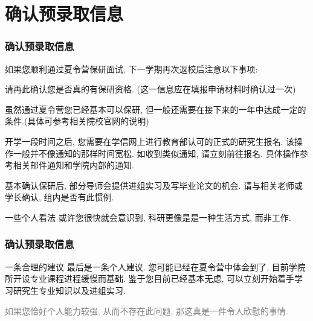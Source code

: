 \documentclass[usenames,dvipsnames]{beamer}
\begin{document}
    \section{确认预录取信息}  
    
    \begin{frame}
      \frametitle{确认预录取信息}
      如果您顺利通过夏令营保研面试, 下一学期再次返校后注意以下事项:
      \begin{description}[leftmargin=!,labelwidth=\widthof{\bfseries 录取信息确认}]
        \small
        \item[保研资格] 请再此确认您是否真的有保研资格. (这一信息应在填报申请材料时确认过一次)
        \item[保研条件] 虽然通过夏令营您已经基本可以保研, 但一般还需要在接下来的一年中达成一定的条件.(具体可参考相关院校官网的说明)
        \item[正式申请] 开学一段时间之后, 您需要在学信网上进行教育部认可的正式的研究生报名. 该操作一般并不像通知的那样时间宽松. 如收到类似通知, 请立刻前往报名. 具体操作参考相关邮件通知和学院内部的通知.
        \item[毕业论文] 基本确认保研后, 部分导师会提供进组实习及写毕业论文的机会. 请与相关老师或学长确认, 组内是否有此惯例. 
      \end{description} 

      {
        \begin{block}{\small{一些个人看法}}
          或许您很快就会意识到, 科研更像是是一种生活方式, 而非工作.
        \end{block}
      }
    \end{frame}

    \begin{frame}
      \frametitle{确认预录取信息}
      \begin{block}{一条合理的建议}
        最后是一条个人建议. 您可能已经在夏令营中体会到了, 目前学院所开设专业课程进程缓慢而基础. 鉴于您目前已经基本无虑, 可以立刻开始着手学习研究生专业知识以及进组实习. 
      \end{block}
      {\small\textcolor{gray}{如果您恰好个人能力较强, 从而不存在此问题, 那这真是一件令人欣慰的事情.}}
    \end{frame}
\end{document}
